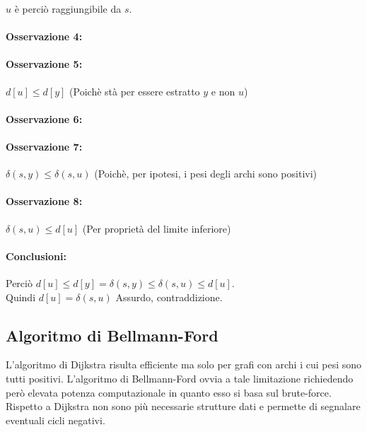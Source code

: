 \documentclass[tikz]{article}
\let\oldparagraph\paragraph
\renewcommand{\paragraph}[1]{\oldparagraph{#1}\mbox{}}
\begin{document}
{{$u$ è perciò raggiungibile da $s$.

\paragraph{Osservazione 4:}

\paragraph{Osservazione 5:}

$d[u] \leq d[y]$ (Poichè stà per essere estratto $y$ e non $u$)

\paragraph{Osservazione 6:}

\paragraph{Osservazione 7:}

$\delta(s,y) \leq \delta(s,u)$ (Poichè, per ipotesi, i pesi degli archi sono positivi)

\paragraph{Osservazione 8:}

$\delta(s,u) \leq d[u]$ (Per proprietà del limite inferiore)

\paragraph{Conclusioni:}

Perciò $d[u] \leq d[y] = \delta(s,y) \leq \delta(s,u) \leq d[u]$. \\ Quindi $d[u]= \delta(s,u)$ Assurdo, contraddizione.


\subsection{Algoritmo di Bellmann-Ford}

{L'algoritmo di Dijkstra risulta efficiente ma solo per grafi con archi i cui pesi sono tutti positivi. L'algoritmo di Bellmann-Ford ovvia a tale limitazione richiedendo però elevata potenza computazionale in quanto esso si basa sul brute-force. Rispetto a Dijkstra non sono più necessarie strutture dati e permette di segnalare eventuali cicli negativi.}

}}
\end{document}
